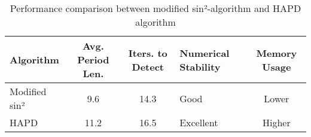 \begin{table}[htbp]
\centering
\caption{Performance comparison between modified sin²-algorithm and HAPD algorithm}
\label{tab:algorithm_comparison}
\begin{tabularx}{\textwidth}{|l|c|c|X|c|} %
\hline
\textbf{Algorithm} & \textbf{Avg. Period Len.} & \textbf{Iters. to Detect} & \textbf{Numerical Stability} & \textbf{Memory Usage} \\
\hline
Modified sin² & 9.6 & 14.3 & Good & Lower \\
\hline
HAPD & 11.2 & 16.5 & Excellent & Higher \\
\hline
\end{tabularx}
\end{table} 